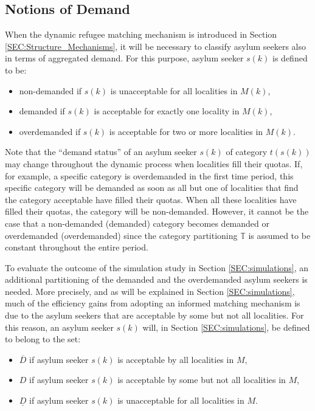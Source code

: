 \documentclass[12pt,fleqn]{article}
\begin{document}
\subsection{Notions of Demand}
When the dynamic refugee matching mechanism is introduced in Section \ref{SEC:Structure_Mechanisms}, it will be necessary to classify asylum seekers also in terms of aggregated demand. For this purpose, asylum seeker $s(k)$ is defined to be:
\begin{itemize}
\item non-demanded if $s(k)$ is unacceptable for all localities in $M(k)$,

\item demanded if $s(k)$ is acceptable for exactly one locality in $M(k)$,

\item overdemanded if $s(k)$ is acceptable for two or more localities in $M(k)$.
\end{itemize}
\noindent Note that the ``demand status'' of an asylum seeker $s(k)$ of category $t(s(k))$ may change throughout the dynamic process when localities fill their quotas. If, for example, a specific category is overdemanded in the first time period, this specific category will be demanded as soon as all but one of localities that find the category acceptable have filled their quotas. When all these localities have filled their quotas, the category will be non-demanded. However, it cannot be the case that a non-demanded (demanded) category becomes demanded or overdemanded (overdemanded) since the category partitioning $\mathbb{T}$ is assumed to be constant throughout the entire period.

To evaluate the outcome of the simulation study in Section \ref{SEC:simulations}, an additional partitioning of the demanded and the overdemanded asylum seekers is needed. More precisely, and as will be explained in Section \ref{SEC:simulations}, much of the efficiency gains from adopting an informed matching mechanism is due to the asylum seekers that are acceptable by some but not all localities. For this reason, an asylum seeker $s(k)$ will, in Section \ref{SEC:simulations}, be defined to belong to the set:
\begin{itemize}
\item $\overline{D}$ if asylum seeker $s(k)$ is acceptable by all localities in $M$,

\item $D$ if asylum seeker $s(k)$ is acceptable by some but not all localities in $M$,

\item $\underline{D}$ if asylum seeker $s(k)$ is unacceptable for all localities in $M$.
\end{itemize}
\end{document}
